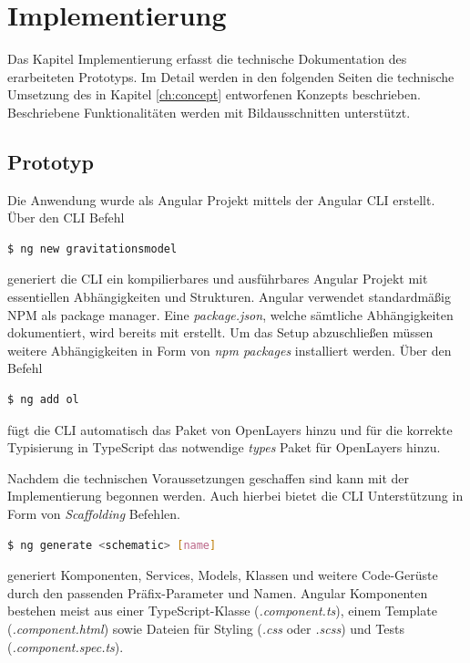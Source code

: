 \chapter{Implementierung}
\label{ch:implementierung}
Das Kapitel Implementierung erfasst die technische Dokumentation des erarbeiteten Prototyps.
Im Detail werden in den folgenden Seiten die technische Umsetzung des in Kapitel \ref{ch:concept} entworfenen Konzepts beschrieben. 
Beschriebene Funktionalitäten werden mit Bildausschnitten unterstützt.

\section{Prototyp}
Die Anwendung wurde als Angular Projekt mittels der Angular CLI erstellt. 
Über den CLI Befehl 

\begin{lstlisting}[language=bash, caption={Erstellen eines neuen Projektes}]
$ ng new gravitationsmodel
\end{lstlisting}

generiert die CLI ein kompilierbares und ausführbares Angular Projekt mit essentiellen Abhängigkeiten und Strukturen.
Angular verwendet standardmäßig NPM als package manager.
Eine \emph{package.json}, welche sämtliche Abhängigkeiten dokumentiert, wird bereits mit erstellt.
Um das Setup abzuschließen müssen weitere Abhängigkeiten in Form von \emph{npm packages} installiert werden.
Über den Befehl 

\begin{lstlisting}[language=bash, caption={Hinzufügen des OpenLayers Pakets}]
$ ng add ol
\end{lstlisting}

fügt die CLI automatisch das Paket von OpenLayers hinzu und für die korrekte Typisierung in TypeScript das notwendige \emph{types} Paket für OpenLayers hinzu.

Nachdem die technischen Voraussetzungen geschaffen sind kann mit der Implementierung begonnen werden.
Auch hierbei bietet die CLI Unterstützung in Form von \emph{Scaffolding} Befehlen.

\begin{lstlisting}[language=bash, caption={Angular schematic Befehl zum Erstellen}]
$ ng generate <schematic> [name]
\end{lstlisting}

generiert Komponenten, Services, Models, Klassen und weitere Code-Gerüste durch den passenden Präfix-Parameter und Namen.
Angular Komponenten bestehen meist aus einer TypeScript-Klasse (\emph{.component.ts}), einem Template (\emph{.component.html}) sowie Dateien für Styling (\emph{.css} oder \emph{.scss}) und Tests (\emph{.component.spec.ts}).

